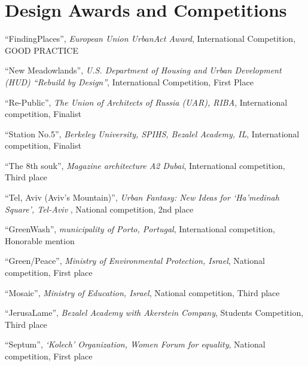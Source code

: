 \section*{Design Awards and Competitions}

\begin{tablist}

    \item[2019]\tab \enquote{FindingPlaces},
    \textit{European Union UrbanAct Award},
    International Competition,
    GOOD PRACTICE


    \item[2015]\tab \enquote{New Meadowlands},
    \textit{U.S. Department of Housing and Urban Development (HUD) “Rebuild by Design”},
    International Competition,
    First Place


    \item[2011]\tab \enquote{Re-Public},
    \textit{The Union of Architects of Russia (UAR), RIBA},
    International competition,
    Finalist


    \item[2010]\tab \enquote{Station No.5},
    \textit{Berkeley University, SPIHS, Bezalel Academy, IL},
    International competition,
    Finalist


    \item[2009]\tab \enquote{The 8th souk},
    \textit{Magazine architecture A2 Dubai},
    International competition,
    Third place


    \item[2008]\tab \enquote{Tel, Aviv (Aviv’s Mountain)},
    \textit{Urban Fantasy: New Ideas for ‘Ha’medinah Square’, Tel-Aviv },
    National competition,
    2nd place


    \item[2008]\tab \enquote{GreenWash},
    \textit{municipality of Porto, Portugal},
    International competition,
    Honorable mention


    \item[2007]\tab \enquote{Green/Peace},
    \textit{Ministry of Environmental Protection, Israel},
    National competition,
    First place


    \item[2006]\tab \enquote{Mosaic},
    \textit{Ministry of Education, Israel},
    National competition,
    Third place


    \item[2006]\tab \enquote{JerusaLame},
    \textit{Bezalel Academy with Akerstein Company},
    Students Competition,
    Third place


    \item[2005]\tab \enquote{Septum},
    \textit{‘Kolech’ Organization, Women Forum for equality},
    National competition,
    First place


\end{tablist}


